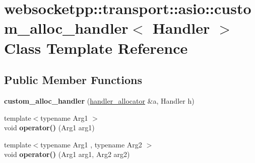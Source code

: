\hypertarget{classwebsocketpp_1_1transport_1_1asio_1_1custom__alloc__handler}{}\section{websocketpp\+:\+:transport\+:\+:asio\+:\+:custom\+\_\+alloc\+\_\+handler$<$ Handler $>$ Class Template Reference}
\label{classwebsocketpp_1_1transport_1_1asio_1_1custom__alloc__handler}
\subsection*{Public Member Functions}
\begin{DoxyCompactItemize}
\item 
\mbox{\label{classwebsocketpp_1_1transport_1_1asio_1_1custom__alloc__handler_ab1006c6d3c3016696dd52d7127ec7a98}} 
{\bfseries custom\+\_\+alloc\+\_\+handler} (\mbox{\hyperlink{classwebsocketpp_1_1transport_1_1asio_1_1handler__allocator}{handler\+\_\+allocator}} \&a, Handler h)
\item 
\mbox{\label{classwebsocketpp_1_1transport_1_1asio_1_1custom__alloc__handler_af90b97d3323ff192385dae0eb29b8d0d}} 
{\footnotesize template$<$typename Arg1 $>$ }\\void {\bfseries operator()} (Arg1 arg1)
\item 
\mbox{\label{classwebsocketpp_1_1transport_1_1asio_1_1custom__alloc__handler_a79f7e6c87d8f40890740ff4c8aa560c5}} 
{\footnotesize template$<$typename Arg1 , typename Arg2 $>$ }\\void {\bfseries operator()} (Arg1 arg1, Arg2 arg2)
\end{DoxyCompactItemize}
